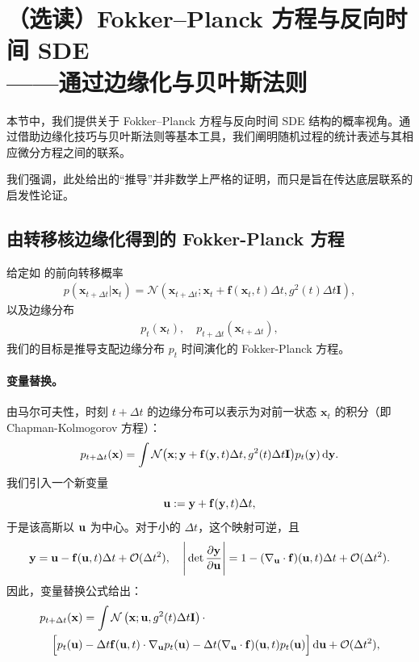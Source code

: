 \clearpage
\newpage

\section{（选读）Fokker–Planck 方程与反向时间 SDE \\——通过边缘化与贝叶斯法则}\label{eq:heuristic-fpe-sde}
本节中，我们提供关于 Fokker–Planck 方程与反向时间 SDE 结构的概率视角。通过借助边缘化技巧与贝叶斯法则等基本工具，我们阐明随机过程的统计表述与其相应微分方程之间的联系。

我们强调，此处给出的``推导''并非数学上严格的证明，而只是旨在传达底层联系的启发性论证。


\subsection{由转移核边缘化得到的 Fokker-Planck 方程}\label{subsec:fpe-reason}
给定如  的前向转移概率
\begin{align*}
    p(\mathbf{x}_{t+\Delta t} | \mathbf{x}_t) = \mathcal{N}\left(\mathbf{x}_{t+\Delta t}; \mathbf{x}_t + \mathbf{f}(\mathbf{x}_t, t)\Delta t, g^2(t)\Delta t \mathbf{I}\right),
\end{align*}
以及边缘分布
\begin{align*}
    p_t(\mathbf{x}_t), \quad p_{t+\Delta t}(\mathbf{x}_{t+\Delta t}),
\end{align*}
我们的目标是推导支配边缘分布 $p_t$ 时间演化的 Fokker-Planck 方程。


\paragraph{变量替换。}
由马尔可夫性，时刻 $t + \Delta t$ 的边缘分布可以表示为对前一状态 $\mathbf{x}_t$ 的积分（即 Chapman-Kolmogorov 方程）：
\begin{align*}
p_{t+\Delta t}({\mathbf{x}})
= \int \mathcal N \big({\mathbf{x}}; {\mathbf{y}}+{\mathbf{f}}({\mathbf{y}},t)\Delta t, g^2(t)\Delta t {\mathbf{I}}\big) p_t({\mathbf{y}}) \mathop{}\!\mathrm{d}{\mathbf{y}}.
\end{align*}
 我们引入一个新变量
\[
{\mathbf{u}}  :=  {\mathbf{y}}+{\mathbf{f}}({\mathbf{y}},t)\Delta t,
\]
于是该高斯以 ${\mathbf{u}}$ 为中心。对于小的 $\Delta t$，这个映射可逆，且
\[
{\mathbf{y}}  =  {\mathbf{u}}-{\mathbf{f}}({\mathbf{u}},t)\Delta t+\mathcal O(\Delta t^2),
\quad
\Bigg|\det\frac{\partial {\mathbf{y}}}{\partial {\mathbf{u}}}\Bigg|
 = 1-(\nabla_{\mathbf{u}} \cdot{\mathbf{f}})({\mathbf{u}},t) \Delta t+\mathcal O(\Delta t^2).
\]
因此，变量替换公式给出：
\begin{align*}
    p_{t+\Delta t}({\mathbf{x}})
&= \int \mathcal N\left({\mathbf{x}};{\mathbf{u}},g^2(t)\Delta t{\mathbf{I}}\right) \cdot
\\\quad\Big[p_t({\mathbf{u}})&-\Delta t {\mathbf{f}}({\mathbf{u}},t) \cdot \nabla_{\mathbf{u}} p_t({\mathbf{u}})
-\Delta t (\nabla_{\mathbf{u}} \cdot{\mathbf{f}})({\mathbf{u}},t) p_t({\mathbf{u}})\Big] \mathop{}\!\mathrm{d}{\mathbf{u}}
+\mathcal O(\Delta t^2),
\end{align*}

